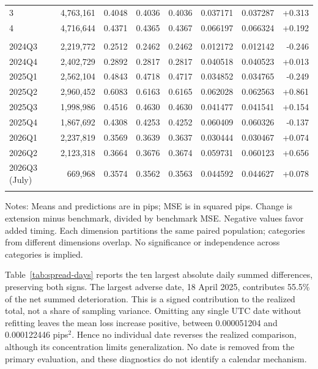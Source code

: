 \documentclass[12pt,letterpaper]{article}
\begin{document}
{\begin{longtable}{lrrrrrrr}
3 & 4,763,161 & 0.4048 & 0.4036 & 0.4036 & 0.037171 & 0.037287 & +0.313 \\
4 & 4,716,644 & 0.4371 & 0.4365 & 0.4367 & 0.066197 & 0.066324 & +0.192 \\
\addlinespace
\multicolumn{8}{l}{\textit{Calendar quarter}}\\
2024Q3 & 2,219,772 & 0.2512 & 0.2462 & 0.2462 & 0.012172 & 0.012142 & -0.246 \\
2024Q4 & 2,402,729 & 0.2892 & 0.2817 & 0.2817 & 0.040518 & 0.040523 & +0.013 \\
2025Q1 & 2,562,104 & 0.4843 & 0.4718 & 0.4717 & 0.034852 & 0.034765 & -0.249 \\
2025Q2 & 2,960,452 & 0.6083 & 0.6163 & 0.6165 & 0.062028 & 0.062563 & +0.861 \\
2025Q3 & 1,998,986 & 0.4516 & 0.4630 & 0.4630 & 0.041477 & 0.041541 & +0.154 \\
2025Q4 & 1,867,692 & 0.4308 & 0.4253 & 0.4252 & 0.060409 & 0.060326 & -0.137 \\
2026Q1 & 2,237,819 & 0.3569 & 0.3639 & 0.3637 & 0.030444 & 0.030467 & +0.074 \\
2026Q2 & 2,123,318 & 0.3664 & 0.3676 & 0.3674 & 0.059731 & 0.060123 & +0.656 \\
2026Q3 (July) & 669,968 & 0.3574 & 0.3562 & 0.3563 & 0.044592 & 0.044627 & +0.078 \\
\addlinespace
\end{longtable}
\noindent\footnotesize Notes: Means and predictions are in pips; MSE is in squared pips. Change is extension minus benchmark, divided by benchmark MSE. Negative values favor added timing. Each dimension partitions the same paired population; categories from different dimensions overlap. No significance or independence across categories is implied.\normalsize
}

Table~\ref{tab:spread-days} reports the ten largest absolute daily summed differences, preserving both signs. The largest adverse date, 18 April 2025, contributes 55.5\% of the net summed deterioration. This is a signed contribution to the realized total, not a share of sampling variance. Omitting any single UTC date without refitting leaves the mean loss increase positive, between 0.000051204 and 0.000122446 pips$^2$. Hence no individual date reverses the realized comparison, although its concentration limits generalization. No date is removed from the primary evaluation, and these diagnostics do not identify a calendar mechanism.
\end{document}
